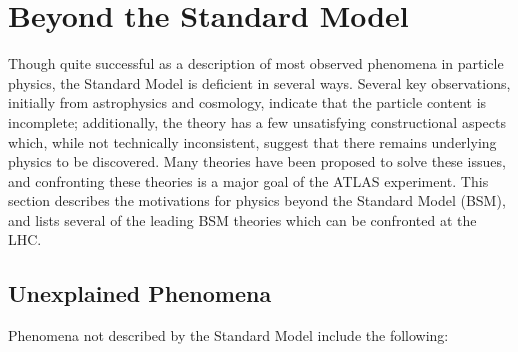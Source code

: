 \section{Beyond the Standard Model}\label{sec:bsm}
Though quite successful as a description of most observed phenomena in particle physics, the Standard Model is deficient in several ways. Several key observations, initially from astrophysics and cosmology, indicate that the particle content is incomplete; additionally, the theory has a few unsatisfying constructional aspects which, while not technically inconsistent, suggest that there remains underlying physics to be discovered. Many theories have been proposed to solve these issues, and confronting these theories is a major goal of the ATLAS experiment. This section describes the motivations for physics beyond the Standard Model (BSM), and lists several of the leading BSM theories which can be confronted at the LHC.

\subsection{Unexplained Phenomena}\label{sec:bsm-unexplained-phenomena}

Phenomena not described by the Standard Model include the following:

